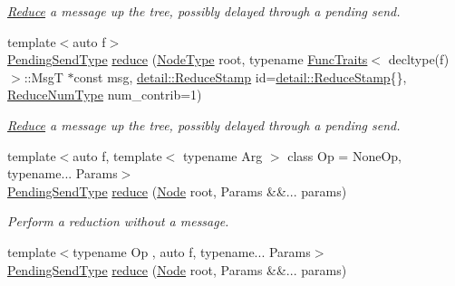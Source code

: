 \begin{DoxyCompactItemize}
\begin{DoxyCompactList}\small\item\em \hyperlink{structvt_1_1collective_1_1reduce_1_1_reduce}{Reduce} a message up the tree, possibly delayed through a pending send. \end{DoxyCompactList}\item 
{\footnotesize template$<$auto f$>$ }\\\hyperlink{structvt_1_1collective_1_1reduce_1_1_reduce_a0474b491f3c93014d9a0ce0356c6bfd5}{Pending\+Send\+Type} \hyperlink{structvt_1_1collective_1_1reduce_1_1_reduce_a0cd6c7ff3201b642905b60241138457f}{reduce} (\hyperlink{namespacevt_a866da9d0efc19c0a1ce79e9e492f47e2}{Node\+Type} root, typename \hyperlink{structvt_1_1_func_traits}{Func\+Traits}$<$ decltype(f)$>$\+::MsgT $\ast$const msg, \hyperlink{namespacevt_1_1collective_1_1reduce_1_1detail_aacc1fcd729d934ba143fee3a943bf9e7}{detail\+::\+Reduce\+Stamp} id=\hyperlink{namespacevt_1_1collective_1_1reduce_1_1detail_aacc1fcd729d934ba143fee3a943bf9e7}{detail\+::\+Reduce\+Stamp}\{\}, \hyperlink{structvt_1_1collective_1_1reduce_1_1_reduce_a6c3e63aca10c31d2823b0b18cf9762a4}{Reduce\+Num\+Type} num\+\_\+contrib=1)
\begin{DoxyCompactList}\small\item\em \hyperlink{structvt_1_1collective_1_1reduce_1_1_reduce}{Reduce} a message up the tree, possibly delayed through a pending send. \end{DoxyCompactList}\item 
{\footnotesize template$<$auto f, template$<$ typename Arg $>$ class Op = None\+Op, typename... Params$>$ }\\\hyperlink{structvt_1_1collective_1_1reduce_1_1_reduce_a0474b491f3c93014d9a0ce0356c6bfd5}{Pending\+Send\+Type} \hyperlink{structvt_1_1collective_1_1reduce_1_1_reduce_a27af5fdbab0b1c2767bdbcff6dced032}{reduce} (\hyperlink{namespacevt_a04777c732e1a2b2c317995af9972b999}{Node} root, Params \&\&... params)
\begin{DoxyCompactList}\small\item\em Perform a reduction without a message. \end{DoxyCompactList}\item 
{\footnotesize template$<$typename Op , auto f, typename... Params$>$ }\\\hyperlink{structvt_1_1collective_1_1reduce_1_1_reduce_a0474b491f3c93014d9a0ce0356c6bfd5}{Pending\+Send\+Type} \hyperlink{structvt_1_1collective_1_1reduce_1_1_reduce_aea9bec63d9cecccc6ef530e4d003e03e}{reduce} (\hyperlink{namespacevt_a04777c732e1a2b2c317995af9972b999}{Node} root, Params \&\&... params)

\end{DoxyCompactItemize}

